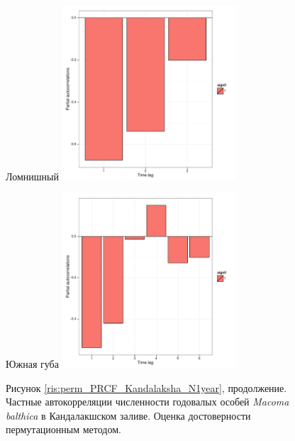 \documentclass[12pt, a4paper]{disser}
\begin{document}
\begin{figure}[ht]
	\begin{minipage}[b]{.46\linewidth}
	\begin{center}
	{\tiny Ломнишный}
	\includegraphics[width=65mm]{../White_Sea/oneyear_all_Kandalaksha_all/perm_PRCF_Lomnishniy_N1y.pdf}
	\end{center}
	\end{minipage}
%
	\hfil %
%
	\begin{minipage}[b]{.46\linewidth}
	\begin{center}
	{\tiny Южная губа}
	\includegraphics[width=65mm]{../White_Sea/oneyear_all_Kandalaksha_all/perm_PRCF_YuG_N1y.pdf}
	\end{center}
	\end{minipage}

\begin{center}
Рисунок \ref{ris:perm_PRCF_Kandalaksha_N1year}, продолжение. Частные автокорреляции численности годовалых особей {\it Macoma balthica} в Кандалакшском заливе. Оценка достоверности пермутационным методом.
\end{center}
	\end{figure}
\end{document}

